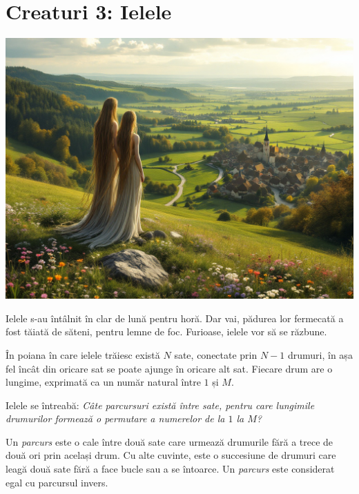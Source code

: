 \documentclass[12pt,a4paper]{article}
\begin{document}


\section*{Creaturi 3: Ielele}


\begin{center}
\includegraphics[scale=0.15]{iele.jpg}
\end{center}

Ielele s-au întâlnit în clar de lună pentru horă. Dar vai, pădurea lor fermecată a fost tăiată de săteni, pentru lemne de foc. Furioase, ielele vor să se răzbune. 

\vspace{1em}

În poiana în care ielele trăiesc există $N$ sate, conectate prin $N - 1$ drumuri, în așa fel încât din oricare sat se poate ajunge în oricare alt sat. Fiecare drum are o lungime, exprimată ca un număr natural între $1$ și $M$.

\vspace{1em}

Ielele se întreabă: \textit{Câte parcursuri există între sate, pentru care lungimile drumurilor formează o permutare a numerelor de la $1$ la $M$?}

\vspace{1em}

Un \textit{parcurs} este o cale între două sate care urmează drumurile fără a trece de două ori prin același drum. Cu alte cuvinte, este o succesiune de drumuri care leagă două sate fără a face bucle sau a se întoarce. Un \textit{parcurs} este considerat egal cu parcursul invers.
\end{document}
